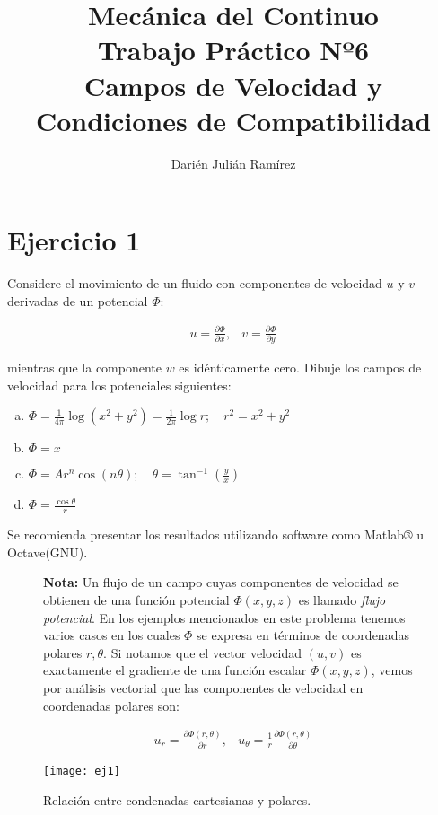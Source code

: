 \documentclass[a4paper,10pt,twoside,final,spanish]{article}
\title{\Huge Mecánica del Continuo \\
			 Trabajo Práctico Nº6  \\
			 Campos de Velocidad y Condiciones de Compatibilidad}
\author{Darién Julián Ramírez}
\date{}
\begin{document}
\maketitle %

\section*{Ejercicio 1}

Considere el movimiento de un fluido con componentes de velocidad $u$ y $v$ derivadas de un potencial $\Phi$:
   
\[
\begin{array}{cc}
\displaystyle u=\frac{\partial\Phi}{\partial x}, &
\displaystyle v=\frac{\partial\Phi}{\partial y}
\end{array}
\]

mientras que la componente $w$ es idénticamente cero. Dibuje los campos de velocidad 
para los potenciales siguientes:

\begin{enumerate}[a)]
\item $\displaystyle \Phi=\frac{1}{4\pi}\log(x^{2}+y^{2})=\frac{1}{2\pi}\log r;
\quad r^{2}=x^{2}+y^{2}$
\item $\displaystyle \Phi=x$
\item $\displaystyle \Phi=Ar^{n}\cos(n\theta);
\quad \theta=\tan^{-1}\left(\frac{y}{x}\right)$
\item $\displaystyle \Phi=\frac{\cos\theta}{r}$
\end{enumerate}

Se recomienda presentar los resultados utilizando software como Matlab® u Octave(GNU). 

\begin{figure}[htbp]
\begin{minipage}{0.5\linewidth}

\textbf{Nota:} Un flujo de un campo cuyas componentes de velocidad se obtienen de una función potencial $\Phi(x,y,z)$ es llamado \textit{flujo potencial}. En los ejemplos mencionados en este problema tenemos varios casos en los cuales $\Phi$ se expresa en términos de coordenadas polares $r,\theta$. Si notamos que el vector velocidad $(u,v)$  es exactamente el gradiente de una función escalar $\Phi(x,y,z)$, vemos por análisis  vectorial que las componentes de velocidad en coordenadas polares son:

\[
\begin{array}{cc}
\displaystyle u_{r}=\frac{\partial\Phi(r,\theta)}{\partial r}, &
\displaystyle u_{\theta}=\frac{1}{r}\frac{\partial\Phi(r,\theta)}{\partial\theta}
\end{array}
\]

\end{minipage} \hfill \begin{minipage}{0.45\linewidth}

\centerline{\texttt{[image: ej1]}}
\caption{Relación entre condenadas cartesianas y polares.}
\label{fig:ej1}

\end{minipage}
\end{figure}
\end{document}
